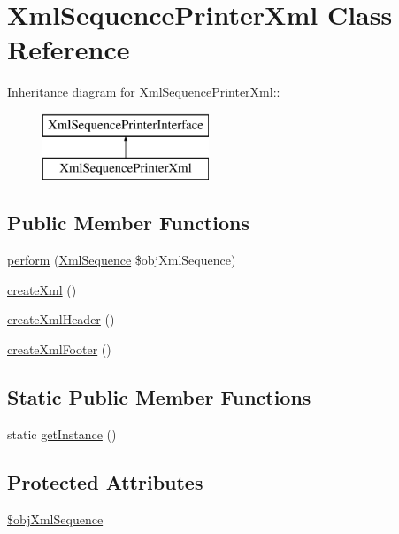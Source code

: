 \hypertarget{class_xml_sequence_printer_xml}{
\section{XmlSequencePrinterXml Class Reference}
\label{class_xml_sequence_printer_xml}
}
Inheritance diagram for XmlSequencePrinterXml::\begin{figure}[H]
\begin{center}
\leavevmode
\includegraphics[height=2cm]{class_xml_sequence_printer_xml}
\end{center}
\end{figure}
\subsection*{Public Member Functions}
\begin{CompactItemize}
\item 
\hyperlink{class_xml_sequence_printer_xml_7e88c479f35acfc1ce0f053c4dbadb1b}{perform} (\hyperlink{class_xml_sequence}{XmlSequence} \$objXmlSequence)
\item 
\hyperlink{class_xml_sequence_printer_xml_15a782830da7eeff1fc9746d223452ac}{createXml} ()
\item 
\hyperlink{class_xml_sequence_printer_xml_534160e28dc8623f138311e4a73be081}{createXmlHeader} ()
\item 
\hyperlink{class_xml_sequence_printer_xml_774ffc0433f81a35080033382a39d525}{createXmlFooter} ()
\end{CompactItemize}
\subsection*{Static Public Member Functions}
\begin{CompactItemize}
\item 
static \hyperlink{class_xml_sequence_printer_xml_1c628de89547bd7a6aa509748e562e67}{getInstance} ()
\end{CompactItemize}
\subsection*{Protected Attributes}
\begin{CompactItemize}
\item 
\hyperlink{class_xml_sequence_printer_xml_c24cec88eff41ddb99b215601cd6f5d8}{\$objXmlSequence}
\end{CompactItemize}
